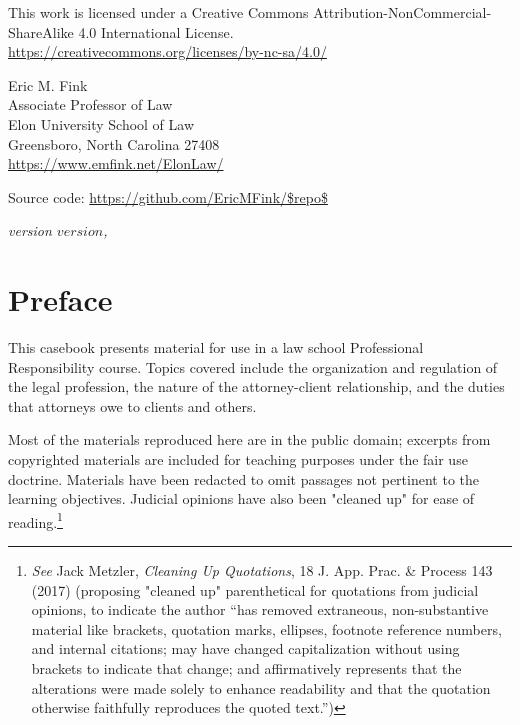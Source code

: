 \clearpage


\thispagestyle{empty}
\begingroup
\parindent 0pt
\vspace*{\fill}

\ccbyncsa

\begin{small}
\raggedright{This work is licensed under a Creative Commons Attribution-NonCommercial-ShareAlike 4.0 International License.} \\
\url{https://creativecommons.org/licenses/by-nc-sa/4.0/}

\vspace{1em}

Eric M. Fink\\
Associate Professor of Law \\
Elon University School of Law \\
Greensboro, North Carolina 27408 \\
\url{https://www.emfink.net/ElonLaw/}

\vspace{1em}

Source code: \url{https://github.com/EricMFink/$repo$}

\itshape{version $version$, \monthyear}

\end{small}
\endgroup

\clearpage


\thispagestyle{empty}

\vspace*{\fill}
\vspace*{\fill}

\chapter*{Preface}

This casebook presents material for use in a law school Professional Responsibility course. Topics covered include the organization and regulation of the legal profession, the nature of the attorney-client relationship, and the duties that attorneys owe to clients and others.

Most of the materials reproduced here are in the public domain; excerpts from copyrighted materials are included for teaching purposes under the fair use doctrine. Materials have been redacted to omit passages not pertinent to the learning objectives. Judicial opinions have also been "cleaned up" for ease of reading.\footnote{\textit{See} Jack Metzler, {\textit{Cleaning Up Quotations}}, 18 J. App. Prac. \& Process 143 (2017) (proposing "cleaned up" parenthetical for quotations from judicial opinions, to indicate the author “has removed extraneous, non-substantive material like brackets, quotation marks, ellipses, footnote reference numbers, and internal citations; may have changed capitalization without using brackets to indicate that change; and affirmatively represents that the alterations were made solely to enhance readability and that the quotation otherwise faithfully reproduces the quoted text.”)} 